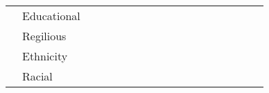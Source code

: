 \begin{table*}[!h]
{\begin{tabular}{l|l|l|l|l|l|l|l|l|l|l|l|l|l|l|l|l|l}
                                                        & Educational             & \multicolumn{1}{l|}{} & \multicolumn{1}{l|}{}                  & \multicolumn{1}{l|}{} & \multicolumn{1}{l|}{}                  & \multicolumn{1}{l|}{} & \multicolumn{1}{l|}{}                  & \multicolumn{1}{l|}{} &                   & \multicolumn{1}{l|}{} & \multicolumn{1}{l|}{}                  & \multicolumn{1}{l|}{} & \multicolumn{1}{l|}{}                  & \multicolumn{1}{l|}{} & \multicolumn{1}{l|}{}                  & \multicolumn{1}{l|}{} &                   \\ \cline{2-3} \cline{5-5} \cline{7-7} \cline{9-9} \cline{11-11} \cline{13-13} \cline{15-15} \cline{17-17}
                                                        & Regilious               & \multicolumn{1}{l|}{} & \multicolumn{1}{l|}{}                  & \multicolumn{1}{l|}{} & \multicolumn{1}{l|}{}                  & \multicolumn{1}{l|}{} & \multicolumn{1}{l|}{}                  & \multicolumn{1}{l|}{} &                   & \multicolumn{1}{l|}{} & \multicolumn{1}{l|}{}                  & \multicolumn{1}{l|}{} & \multicolumn{1}{l|}{}                  & \multicolumn{1}{l|}{} & \multicolumn{1}{l|}{}                  & \multicolumn{1}{l|}{} &                   \\ \cline{2-3} \cline{5-5} \cline{7-7} \cline{9-9} \cline{11-11} \cline{13-13} \cline{15-15} \cline{17-17}
                                                        & Ethnicity               & \multicolumn{1}{l|}{} & \multicolumn{1}{l|}{}                  & \multicolumn{1}{l|}{} & \multicolumn{1}{l|}{}                  & \multicolumn{1}{l|}{} & \multicolumn{1}{l|}{}                  & \multicolumn{1}{l|}{} &                   & \multicolumn{1}{l|}{} & \multicolumn{1}{l|}{}                  & \multicolumn{1}{l|}{} & \multicolumn{1}{l|}{}                  & \multicolumn{1}{l|}{} & \multicolumn{1}{l|}{}                  & \multicolumn{1}{l|}{} &                   \\ \cline{2-3} \cline{5-5} \cline{7-7} \cline{9-9} \cline{11-11} \cline{13-13} \cline{15-15} \cline{17-17}
                                                        & Racial                  & \multicolumn{1}{l|}{} & \multicolumn{1}{l|}{}                  & \multicolumn{1}{l|}{} & \multicolumn{1}{l|}{}                  & \multicolumn{1}{l|}{} & \multicolumn{1}{l|}{}                  & \multicolumn{1}{l|}{} &                   & \multicolumn{1}{l|}{} & \multicolumn{1}{l|}{}                  & \multicolumn{1}{l|}{} & \multicolumn{1}{l|}{}                  & \multicolumn{1}{l|}{} & \multicolumn{1}{l|}{}                  & \multicolumn{1}{l|}{} &                   \\ \cline{2-3} \cline{5-5} \cline{7-7} \cline{9-9} \cline{11-11} \cline{13-13} \cline{15-15} \cline{17-17}

\end{tabular}}
\end{table*}
